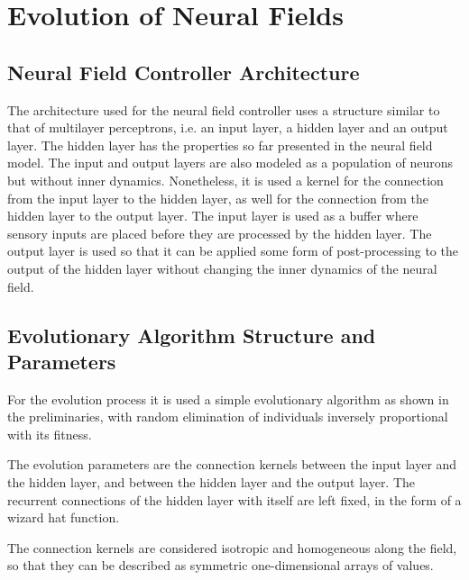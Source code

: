 \section{Evolution of Neural Fields}
\subsection{Neural Field Controller Architecture}
The architecture used for the neural field controller uses a structure
similar to that of multilayer perceptrons, i.e. an input layer, a
hidden layer and an output layer. The hidden layer has the properties
so far presented in the neural field model. The input and output
layers are also modeled as a population of neurons but without inner
dynamics. Nonetheless, it is used a kernel for the connection from the
input layer to the hidden layer, as well for the connection from the
hidden layer to the output layer. The input layer is used as a buffer
where sensory inputs are placed before they are processed by the
hidden layer. The output layer is used so that it can be applied some
form of post-processing to the output of the hidden layer without
changing the inner dynamics of the neural field.

\subsection{Evolutionary Algorithm Structure and Parameters}
For the evolution process it is used a simple evolutionary algorithm
as shown in the preliminaries, with random elimination of individuals
inversely proportional with its fitness.


The evolution parameters are the connection kernels between the input
layer and the hidden layer, and between the hidden layer and the
output layer. The recurrent connections of the hidden layer with
itself are left fixed, in the form of a wizard hat function.

The connection kernels are considered isotropic and homogeneous along
the field, so that they can be described as symmetric one-dimensional
arrays of values. 

